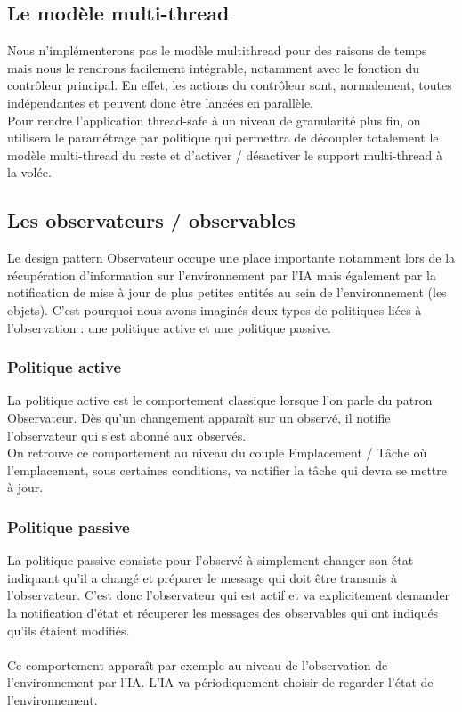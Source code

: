 \subsection{Le modèle multi-thread}
Nous n'implémenterons pas le modèle multithread pour des raisons de temps mais nous le rendrons facilement intégrable, notamment avec le fonction du contrôleur principal. En effet, les actions du contrôleur sont, normalement, toutes indépendantes et peuvent donc être lancées en parallèle.\\

Pour rendre l'application thread-safe à un niveau de granularité plus fin, on utilisera le paramétrage par politique qui permettra de découpler totalement le modèle multi-thread du reste et d'activer / désactiver le support multi-thread à la volée.

\subsection{Les observateurs / observables}
Le design pattern Observateur occupe une place importante notamment lors de la récupération d'information sur l'environnement par l'IA mais également par la notification de mise à jour de plus petites entités au sein de l'environnement (les objets). C'est pourquoi nous avons imaginés deux types de politiques liées à l'observation : une politique active et une politique passive.

\subsubsection{Politique active}

La politique active est le comportement classique lorsque l'on parle du patron Observateur. Dès qu'un changement apparaît sur un observé, il notifie l'observateur qui s'est abonné aux observés.\\
On retrouve ce comportement au niveau du couple Emplacement / Tâche où l'emplacement, sous certaines conditions, va notifier la tâche qui devra se mettre à jour.

\subsubsection{Politique passive}

La politique passive consiste pour l'observé à simplement changer son état indiquant qu'il a changé et préparer le message qui doit être transmis à l'observateur. C'est donc l'observateur qui est actif et va explicitement demander la notification d'état et récuperer les messages des observables qui ont indiqués qu'ils étaient modifiés.\\\\
Ce comportement apparaît par exemple au niveau de l'observation de l'environnement par l'IA. L'IA va périodiquement choisir de regarder l'état de l'environnement.

